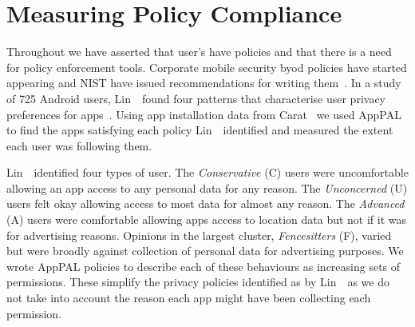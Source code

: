 \documentclass[]{llncs}
\begin{document}
\section{Measuring Policy Compliance}
\label{sec:demonstation}

Throughout we have asserted that user's have policies and that there is a need for policy enforcement tools.
Corporate mobile security \ac{byod} policies have started appearing and NIST have issued recommendations for writing them~\cite{Scarfone:2009vy,Souppaya:2013jf}.
In a study of 725 Android users, Lin~\etal~found four patterns that characterise user privacy preferences for apps~\cite{Sadeh:2014vq}.
Using app installation data from Carat~\cite{Oliner:2013ht} we used AppPAL to find the apps satisfying each policy Lin~\etal~identified and measured the extent each user was following them.

Lin~\etal~identified four types of user.
The \emph{Conservative} (C) users were uncomfortable allowing an app access to any personal data for any reason.
The \emph{Unconcerned} (U) users felt okay allowing access to most data for almost any reason.
The \emph{Advanced} (A) users were comfortable allowing apps access to location data but not if it was for advertising reasons.
Opinions in the largest cluster, \emph{Fencesitters} (F), varied but were broadly against collection of personal data for advertising purposes.
We wrote AppPAL policies to describe each of these behaviours as increasing sets of permissions.
These simplify the privacy policies identified as by Lin~\etal~as we do not take into account the reason each app might have been collecting each permission.
\end{document}
